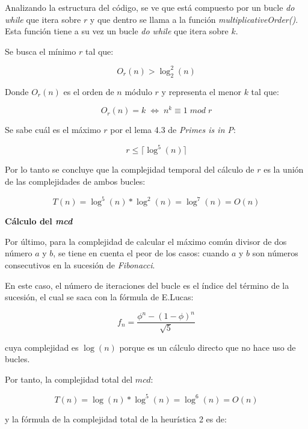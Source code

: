 \documentclass{uc3mpracticas}
\begin{document}
  Analizando la estructura del código, se ve que está compuesto por un bucle \textit{do while} que itera sobre $r$ y que dentro se llama a la función \textit{multiplicativeOrder()}. Esta función tiene a su vez un bucle \textit{do while} que itera sobre $k$.

  \vspace{2mm}

  Se busca el mínimo $r$ tal que:

  $$ O_r(n) > \log_2^2(n) $$

  Donde $O_r(n)$ es el orden de $n$ módulo $r$ y representa el menor $k$ tal que:

  $$ O_r(n) = k \; \Leftrightarrow \; n^k \equiv 1 \; mod \; r$$


  Se sabe cuál es el máximo $r$ por el lema 4.3 de \textit{Primes is in P}\cite{primesinp}:

  $$ r \leq \lceil \log^5(n) \rceil $$

  Por lo tanto se concluye que la complejidad temporal del cálculo de $r$ es la unión de las complejidades de ambos bucles:

  $$ T(n) = \log^5(n) * \log^2(n) = \log^7(n) = O(n)$$

  \vspace{2mm}

  \textbf{Cálculo del \textit{mcd}}

  \vspace{2mm}

  Por último, para la complejidad de calcular el máximo común divisor de dos número $a$ y $b$, se tiene en cuenta el peor de los casos: cuando $a$ y $b$ son números consecutivos en la sucesión de \textit{Fibonacci}.

  \vspace{2mm}

  En este caso, el número de iteraciones del bucle es el índice del término de la sucesión, el cual se saca con la fórmula de E.Lucas:

  $$ f_n =\frac{\phi^n - (1-\phi)^n}{\sqrt{5}} $$

  cuya complejidad es $\log(n) $ porque es un cálculo directo que no hace uso de bucles.

  \vspace{2mm}


  Por tanto, la complejidad total del $mcd$:

  $$ T(n) = \log(n) * \log^5(n) = \log^6(n) = O(n)$$

  y la fórmula de la complejidad total de la heurística 2 es de:
\end{document}
